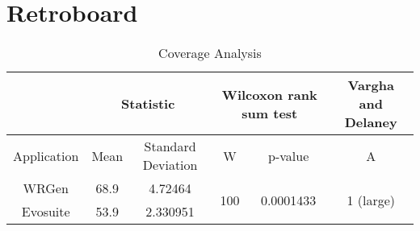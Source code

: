 \section{Retroboard}
\begin{table}[H]
	\centering
	\caption{Coverage Analysis}
	\begin{adjustbox}{max width=\textwidth}
		\begin{tabular}{|c|c|c|c|c|c|}
		\hline
			& \multicolumn{2}{c|}{Statistic} & \multicolumn{2}{c|}{Wilcoxon rank sum test} & Vargha and Delaney    \\
		\hline
			Application & Mean   & Standard Deviation   & W                               & p-value                             & A            			         \\
		\hline
			WRGen       & 68.9     & 4.72464             & \multirow{2}{*}{100}             & \multirow{2}{*}{0.0001433}            & \multirow{2}{*}{1 (large)}  \\
		\cline{1-3}
			Evosuite    & 53.9   & 2.330951            &                                 &                                     &            			   		 \\
		\hline
		\end{tabular}
	\end{adjustbox}
\end{table}

